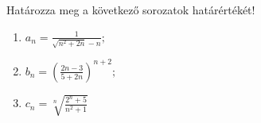 \documentclass[11pt]{scrartcl}
\begin{document}
Határozza meg a következő sorozatok határértékét!
\begin{enumerate}
	\item \(\displaystyle
	      a_n = \frac{1}{\sqrt{n^2 + 2n} - n};
	      \)

	\item \(\displaystyle
	      b_n = \left(
	      \frac{2n - 3}{5 + 2n}
	      \right)^{n + 2};
	      \)

	\item \(\displaystyle
	      c_n = \sqrt[n]{\frac{2^n + 5}{n^2 + 1}}
	      \)
\end{enumerate}
\end{document}
